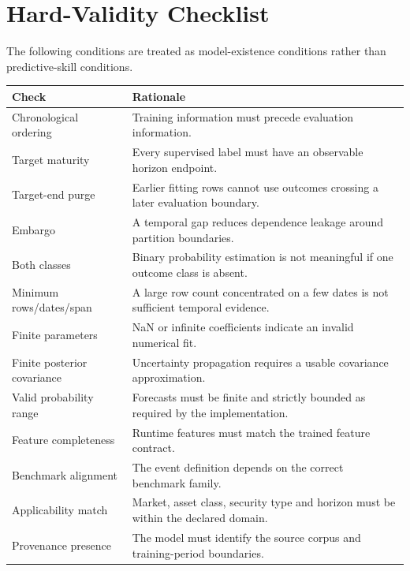 \documentclass[11pt]{article}
\begin{document}
\section{Hard-Validity Checklist}
The following conditions are treated as model-existence conditions rather than predictive-skill conditions.
\begin{longtable}{p{}p{}}
\toprule
Check & Rationale\\
\midrule
\endhead
Chronological ordering & Training information must precede evaluation information.\\
Target maturity & Every supervised label must have an observable horizon endpoint.\\
Target-end purge & Earlier fitting rows cannot use outcomes crossing a later evaluation boundary.\\
Embargo & A temporal gap reduces dependence leakage around partition boundaries.\\
Both classes & Binary probability estimation is not meaningful if one outcome class is absent.\\
Minimum rows/dates/span & A large row count concentrated on a few dates is not sufficient temporal evidence.\\
Finite parameters & NaN or infinite coefficients indicate an invalid numerical fit.\\
Finite posterior covariance & Uncertainty propagation requires a usable covariance approximation.\\
Valid probability range & Forecasts must be finite and strictly bounded as required by the implementation.\\
Feature completeness & Runtime features must match the trained feature contract.\\
Benchmark alignment & The event definition depends on the correct benchmark family.\\
Applicability match & Market, asset class, security type and horizon must be within the declared domain.\\
Provenance presence & The model must identify the source corpus and training-period boundaries.\\
\bottomrule
\end{longtable}
\end{document}
